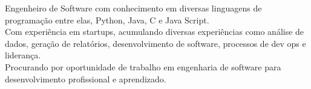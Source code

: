 
Engenheiro de Software com conhecimento em diversas linguagens de programação entre elas, Python, Java, C e Java Script.\\

Com experiência em startups, acumulando diversas experiências como análise de dados, geração de relatórios, desenvolvimento de software, processos de dev ops e liderança.\\

Procurando por oportunidade de trabalho em engenharia de software para desenvolvimento profissional e aprendizado.\\
\vspace{-1.0em} %